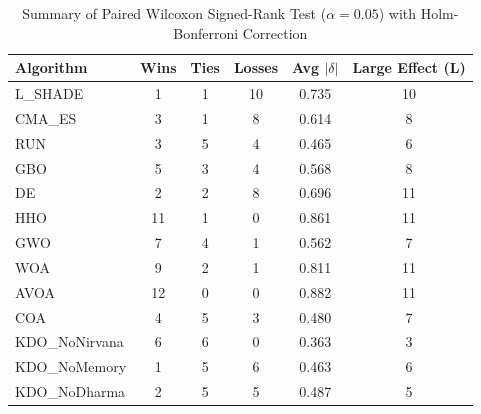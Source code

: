 \begin{table}[!t]
\centering\small
\caption{Summary of Paired Wilcoxon Signed-Rank Test ($\alpha=0.05$) with Holm-Bonferroni Correction}
\label{tab:summary_stats}
\begin{tabular}{l|c|c|c|c|c}
\hline
Algorithm & Wins & Ties & Losses & Avg $|\delta|$ & Large Effect (L) \\\hline\hline
L_SHADE & 1 & 1 & 10 & 0.735 & 10 \\\hline
CMA_ES & 3 & 1 & 8 & 0.614 & 8 \\\hline
RUN & 3 & 5 & 4 & 0.465 & 6 \\\hline
GBO & 5 & 3 & 4 & 0.568 & 8 \\\hline
DE & 2 & 2 & 8 & 0.696 & 11 \\\hline
HHO & 11 & 1 & 0 & 0.861 & 11 \\\hline
GWO & 7 & 4 & 1 & 0.562 & 7 \\\hline
WOA & 9 & 2 & 1 & 0.811 & 11 \\\hline
AVOA & 12 & 0 & 0 & 0.882 & 11 \\\hline
COA & 4 & 5 & 3 & 0.480 & 7 \\\hline
KDO_NoNirvana & 6 & 6 & 0 & 0.363 & 3 \\\hline
KDO_NoMemory & 1 & 5 & 6 & 0.463 & 6 \\\hline
KDO_NoDharma & 2 & 5 & 5 & 0.487 & 5 \\\hline
\end{tabular}
\end{table}
